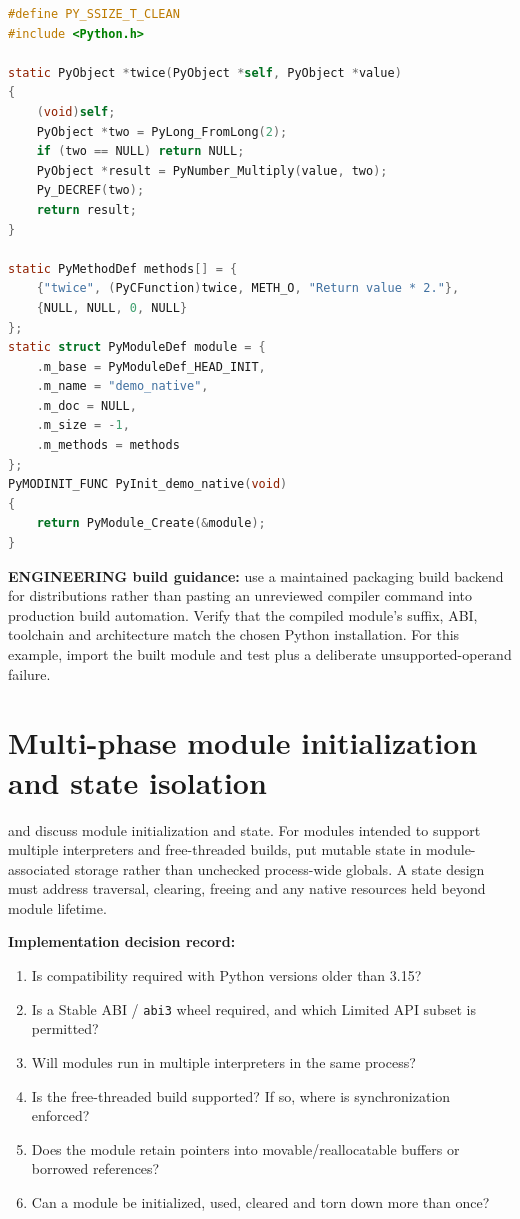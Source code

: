 \documentclass[
  11pt,
]{report}
\newcommand{\passthrough}[1]{#1}
\providecommand{\tightlist}{%
  \setlength{\itemsep}{0pt}\setlength{\parskip}{0pt}}
\begin{document}
\begin{lstlisting}[language=C]
#define PY_SSIZE_T_CLEAN
#include <Python.h>

static PyObject *twice(PyObject *self, PyObject *value)
{
    (void)self;
    PyObject *two = PyLong_FromLong(2);
    if (two == NULL) return NULL;
    PyObject *result = PyNumber_Multiply(value, two);
    Py_DECREF(two);
    return result;
}

static PyMethodDef methods[] = {
    {"twice", (PyCFunction)twice, METH_O, "Return value * 2."},
    {NULL, NULL, 0, NULL}
};
static struct PyModuleDef module = {
    .m_base = PyModuleDef_HEAD_INIT,
    .m_name = "demo_native",
    .m_doc = NULL,
    .m_size = -1,
    .m_methods = methods
};
PyMODINIT_FUNC PyInit_demo_native(void)
{
    return PyModule_Create(&module);
}
\end{lstlisting}

\textbf{ENGINEERING build guidance:} use a maintained packaging build
backend for distributions rather than pasting an unreviewed compiler
command into production build automation. Verify that the compiled
module's suffix, ABI, toolchain and architecture match the chosen Python
installation. For this example, import the built module and test
 plus a deliberate
unsupported-operand failure.

\chapter{Multi-phase module initialization and state
isolation}\label{multi-phase-module-initialization-and-state-isolation}

 and
 discuss module
initialization and state. For modules intended to support multiple
interpreters and free-threaded builds, put mutable state in
module-associated storage rather than unchecked process-wide globals. A
state design must address traversal, clearing, freeing and any native
resources held beyond module lifetime.

\textbf{Implementation decision record:}

\begin{enumerate}
\def\labelenumi{\arabic{enumi}.}
\tightlist
\item
  Is compatibility required with Python versions older than 3.15?
\item
  Is a Stable ABI / \passthrough{\lstinline!abi3!} wheel required, and
  which Limited API subset is permitted?
\item
  Will modules run in multiple interpreters in the same process?
\item
  Is the free-threaded build supported? If so, where is synchronization
  enforced?
\item
  Does the module retain pointers into movable/reallocatable buffers or
  borrowed references?
\item
  Can a module be initialized, used, cleared and torn down more than
  once?
\end{enumerate}
\end{document}
